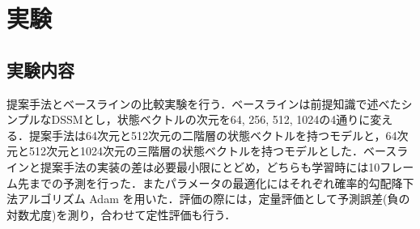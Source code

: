\documentclass[10pt, twocolumn]{jarticle}
\begin{document}

\section{実験}
\label{chap:experiment}


\subsection{実験内容}

提案手法とベースラインの比較実験を行う．ベースラインは前提知識で述べたシンプルなDSSMとし，状態ベクトルの次元を64, 256, 512, 1024の4通りに変える．提案手法は64次元と512次元の二階層の状態ベクトルを持つモデルと，64次元と512次元と1024次元の三階層の状態ベクトルを持つモデルとした．ベースラインと提案手法の実装の差は必要最小限にとどめ，どちらも学習時には10フレーム先までの予測を行った．またパラメータの最適化にはそれぞれ確率的勾配降下法アルゴリズム Adam\cite{kingma2014adam} を用いた．評価の際には，定量評価として予測誤差(負の対数尤度)を測り，合わせて定性評価も行う．


\end{document}
